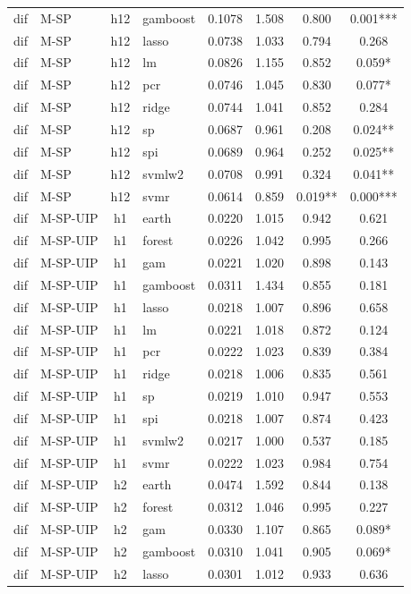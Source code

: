 \begin{ThreePartTable}
\begin{longtable}[t]{llclcccc}
dif & M-SP & h12 & gamboost & 0.1078 & 1.508 & 0.800 & 0.001***\\
dif & M-SP & h12 & lasso & 0.0738 & 1.033 & 0.794 & 0.268\\
dif & M-SP & h12 & lm & 0.0826 & 1.155 & 0.852 & 0.059*\\
dif & M-SP & h12 & pcr & 0.0746 & 1.045 & 0.830 & 0.077*\\
dif & M-SP & h12 & ridge & 0.0744 & 1.041 & 0.852 & 0.284\\
dif & M-SP & h12 & sp & 0.0687 & 0.961 & 0.208 & 0.024**\\
dif & M-SP & h12 & spi & 0.0689 & 0.964 & 0.252 & 0.025**\\
dif & M-SP & h12 & svmlw2 & 0.0708 & 0.991 & 0.324 & 0.041**\\
dif & M-SP & h12 & svmr & 0.0614 & 0.859 & 0.019** & 0.000***\\
\addlinespace
dif & M-SP-UIP & h1 & earth & 0.0220 & 1.015 & 0.942 & 0.621\\
dif & M-SP-UIP & h1 & forest & 0.0226 & 1.042 & 0.995 & 0.266\\
dif & M-SP-UIP & h1 & gam & 0.0221 & 1.020 & 0.898 & 0.143\\
dif & M-SP-UIP & h1 & gamboost & 0.0311 & 1.434 & 0.855 & 0.181\\
dif & M-SP-UIP & h1 & lasso & 0.0218 & 1.007 & 0.896 & 0.658\\
dif & M-SP-UIP & h1 & lm & 0.0221 & 1.018 & 0.872 & 0.124\\
dif & M-SP-UIP & h1 & pcr & 0.0222 & 1.023 & 0.839 & 0.384\\
dif & M-SP-UIP & h1 & ridge & 0.0218 & 1.006 & 0.835 & 0.561\\
dif & M-SP-UIP & h1 & sp & 0.0219 & 1.010 & 0.947 & 0.553\\
dif & M-SP-UIP & h1 & spi & 0.0218 & 1.007 & 0.874 & 0.423\\
dif & M-SP-UIP & h1 & svmlw2 & 0.0217 & 1.000 & 0.537 & 0.185\\
dif & M-SP-UIP & h1 & svmr & 0.0222 & 1.023 & 0.984 & 0.754\\
\addlinespace
dif & M-SP-UIP & h2 & earth & 0.0474 & 1.592 & 0.844 & 0.138\\
dif & M-SP-UIP & h2 & forest & 0.0312 & 1.046 & 0.995 & 0.227\\
dif & M-SP-UIP & h2 & gam & 0.0330 & 1.107 & 0.865 & 0.089*\\
dif & M-SP-UIP & h2 & gamboost & 0.0310 & 1.041 & 0.905 & 0.069*\\
dif & M-SP-UIP & h2 & lasso & 0.0301 & 1.012 & 0.933 & 0.636\\

\end{longtable}
\end{ThreePartTable}
